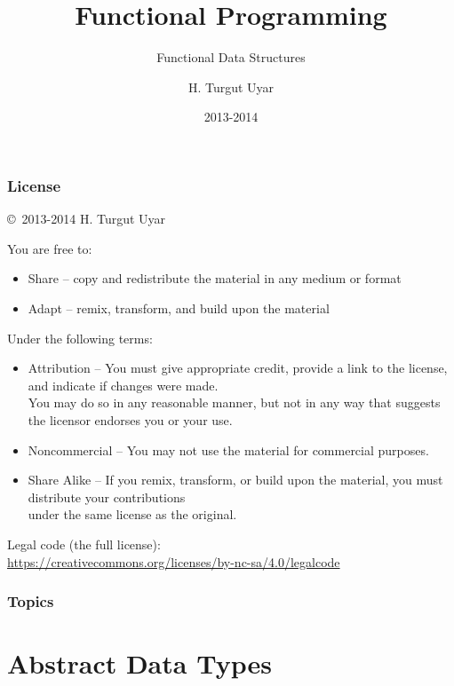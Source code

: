 \documentclass[dvipsnames]{beamer}
\title{Functional Programming}
\subtitle{Functional Data Structures}
\author{H. Turgut Uyar}
\date{2013-2014}
\theoremstyle{plain}
\begin{document}

\begin{frame}
  \titlepage
\end{frame}

\begin{frame}
  \frametitle{License}

  \hfill
  \copyright~2013-2014 H. Turgut Uyar

  \vfill
  \begin{tiny}
    You are free to:
    \begin{itemize}
      \item Share -- copy and redistribute the material in any medium or format
      \item Adapt -- remix, transform, and build upon the material
    \end{itemize}

    Under the following terms:
    \begin{itemize}
      \item Attribution -- You must give appropriate credit, provide a link to
        the license, and indicate if changes were made.\\
        You may do so in any reasonable manner, but not in any way
        that suggests the licensor endorses you or your use.

      \item Noncommercial -- You may not use the material for commercial
        purposes.

      \item Share Alike -- If you remix, transform, or build upon the material,
        you must distribute your contributions\\
        under the same license as the original.
    \end{itemize}
  \end{tiny}

  \vfill
  \begin{small}
    Legal code (the full license):\\
    \url{https://creativecommons.org/licenses/by-nc-sa/4.0/legalcode}
  \end{small}
\end{frame}

\begin{frame}
  \frametitle{Topics}
  \tableofcontents
\end{frame}

\section{Abstract Data Types}
\end{document}
